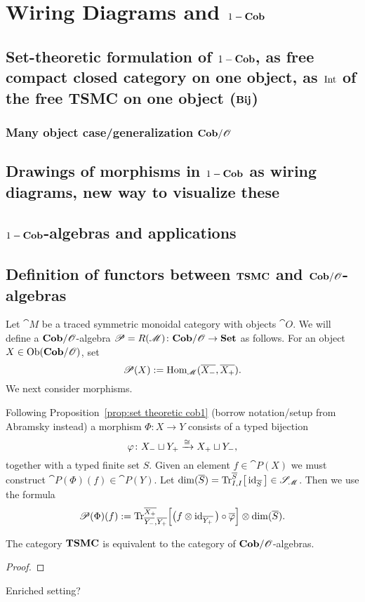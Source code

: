 \chapter{Wiring Diagrams and $1-\mathbf{Cob}$}
\section{Set-theoretic formulation of $1-\mathbf{Cob}$, as free compact closed category on one object, as $\operatorname{Int}$ of the free TSMC on one object ($\mathbf{Bij}$)}
\subsection{Many object case/generalization $\mathbf{Cob}/\mathscr{O}$}

\section{Drawings of morphisms in $1-\mathbf{Cob}$ as wiring diagrams, new way to visualize these}

\section{$1-\mathbf{Cob}$-algebras and applications}

\section{Definition of functors between $\mathbf{TSMC}$ and $\mathbf{Cob}/\mathscr{O}$-algebras}

Let $\cat{M}$ be a traced symmetric monoidal category with objects $\cat{O}$. We will define a $\mathbf{Cob}/\mathscr{O}$-algebra $\mathscr{P}=R(\mathscr{M})\colon\mathbf{Cob}/\mathscr{O}\to\mathbf{Set}$ as follows. For an object $X\in\operatorname{Ob}(\mathbf{Cob}/\mathscr{O})$, set 
$$\mathscr{P}(X):=\operatorname{Hom}_{\mathscr{M}}(\overline{{X_-}},\overline{{X_+}}).$$
We next consider morphisms.

Following Proposition~\ref{prop:set theoretic cob1} (borrow notation/setup from Abramsky instead) a morphism $\Phi\colon X\longrightarrow Y$ consists of a typed bijection 
$$\varphi\colon{X_-}\sqcup {Y_+}\xrightarrow{\cong}{X_+}\sqcup {Y_-},$$ 
together with a typed finite set $S$. Given an element $f\in\cat{P}(X)$ we must construct $\cat{P}(\Phi)(f)\in\cat{P}(Y)$. Let $\dim(\overline{S})=\textnormal{Tr}^{\overline{S}}_{I,I}\big[\operatorname{id}_{\overline{S}}\big]\in\mathscr{S}_{\mathscr{M}}$. Then we use the formula
$$\mathscr{P}(\Phi)(f):=
\textnormal{Tr}^{\overline{X_+}}_{\overline{Y_-},\overline{Y_+}}\Big[\big(f\otimes\operatorname{id}_{\overline{Y_+}}\big)\circ\overline{\varphi}\Big]
\otimes\dim(\overline{S}).	
$$

\begin{theorem}
 The category $\mathbf{TSMC}$ is equivalent to the category of $\mathbf{Cob}/\mathscr{O}$-algebras.
\end{theorem}
\begin{proof}
 
\end{proof}
\begin{corollary}
 Enriched setting?
\end{corollary}


